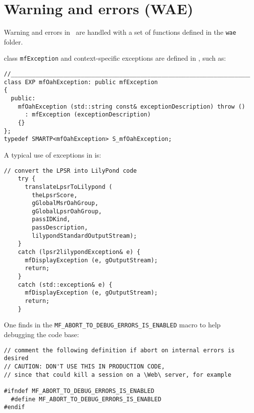 
\chapter{Warning and errors (WAE)}


Warning and errors in \mf\ are handled with a set of functions defined in the {\tt wae} folder.

class   {\tt mfException} and context-specific exceptions are defined in , such as:
\begin{lstlisting}[language=CPlusPlus]
//______________________________________________________________________________
class EXP mfOahException: public mfException
{
  public:
    mfOahException (std::string const& exceptionDescription) throw ()
      : mfException (exceptionDescription)
    {}
};
typedef SMARTP<mfOahException> S_mfOahException;
\end{lstlisting}

A typical use of exceptions in  is:
\begin{lstlisting}[language=CPlusPlus]
    // convert the LPSR into LilyPond code
    try {
      translateLpsrToLilypond (
        theLpsrScore,
        gGlobalMsrOahGroup,
        gGlobalLpsrOahGroup,
        passIDKind,
        passDescription,
        lilypondStandardOutputStream);
    }
    catch (lpsr2lilypondException& e) {
      mfDisplayException (e, gOutputStream);
      return;
    }
    catch (std::exception& e) {
      mfDisplayException (e, gOutputStream);
      return;
    }
\end{lstlisting}


One finds in  the {\tt MF_ABORT_TO_DEBUG_ERRORS_IS_ENABLED} macro to help debugging the code base:
\begin{lstlisting}[language=CPlusPlus]
// comment the following definition if abort on internal errors is desired
// CAUTION: DON'T USE THIS IN PRODUCTION CODE,
// since that could kill a session on a \Web\ server, for example

#ifndef MF_ABORT_TO_DEBUG_ERRORS_IS_ENABLED
  #define MF_ABORT_TO_DEBUG_ERRORS_IS_ENABLED
#endif
\end{lstlisting}
